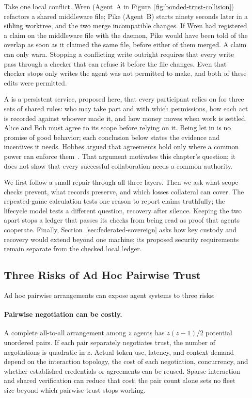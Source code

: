 \documentclass[11pt,a4paper]{article}
\theoremstyle{definition}
\theoremstyle{remark}
\begin{document}
Take one local conflict. Wren (Agent~A in
Figure~\ref{fig:bonded-trust-collision}) refactors a shared middleware file;
Pike (Agent~B) starts ninety seconds later in a sibling worktree, and the two
merge incompatible changes. If Wren had registered a claim on the middleware
file with the daemon, Pike would have been told of the overlap as soon as it
claimed the same file, before either of them merged. A claim can only warn.
Stopping a conflicting write outright requires that every write pass through a
checker that can refuse it before the file changes. Even that checker stops
only writes the agent was not permitted to make, and both of these edits were
permitted.


A  is a persistent service, proposed here, that
every participant relies on for three sets of shared rules: who may take part
and with which permissions, how each act is recorded against whoever made it,
and how money moves when work is settled. Alice and Bob must agree to its
scope before relying on it. Being let in is no promise of good behavior; each
conclusion below states the evidence and incentives it needs. Hobbes argued
that agreements hold only where a common power can enforce
them~. That argument motivates this chapter's
question; it does not show that every successful collaboration needs a common
authority.

We first follow a small repair through all three layers. Then we ask what
scope checks prevent, what records preserve, and which losses collateral can
cover. The repeated-game calculation tests one reason to report claims
truthfully; the lifecycle model tests a different question, recovery after
silence. Keeping the two apart stops a ledger that passes its checks from
being read as proof that agents cooperate. Finally,
Section~\ref{sec:federated-sovereign} asks how key custody and recovery would
extend beyond one machine; its proposed security requirements remain separate
from the checked local ledger.

\subsection{Three Risks of Ad Hoc Pairwise Trust}
Ad hoc pairwise arrangements can expose agent systems to three risks:
\paragraph{Pairwise negotiation can be costly.} A complete all-to-all arrangement among $z$ agents has $z(z-1)/2$ potential unordered pairs. If each pair separately negotiates trust, the number of negotiations is quadratic in $z$. Actual token use, latency, and context demand depend on the interaction topology, the cost of each negotiation, concurrency, and whether established credentials or agreements can be reused. Sparse interaction and shared verification can reduce that cost; the pair count alone sets no fleet size beyond which pairwise trust stops working.
\end{document}
